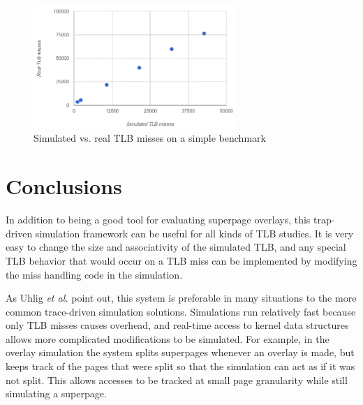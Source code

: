 \begin{figure}
    \centering
    \includegraphics[width=3in]{Figures/Graph2}
    \caption{Simulated vs. real TLB misses on a simple benchmark}
    \label{fig:charts}
\end{figure}

\section{Conclusions}

In addition to being a good tool for evaluating superpage overlays, this trap-driven simulation framework can be useful for all kinds of TLB studies. It is very easy to change the size and associativity of the simulated TLB, and any special TLB behavior that would occur on a TLB miss can be implemented by modifying the miss handling code in the simulation.

As Uhlig \emph{et al.} point out, this system is preferable in many situations to the more common trace-driven simulation solutions\cite{Uhlig}. Simulations run relatively fast because only TLB misses causes overhead, and real-time access to kernel data structures allows more complicated modifications to be simulated. For example, in the overlay simulation the system splits superpages whenever an overlay is made, but keeps track of the pages that were split so that the simulation can act as if it was not split. This allows accesses to be tracked at small page granularity while still simulating a superpage.

